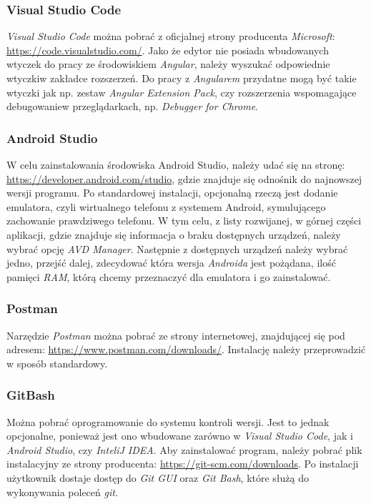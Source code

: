 \documentclass[twoside]{projektInzynierskiMS}
\numberwithin{figure}{section}
\begin{document}
\subsubsection{Visual Studio Code}
\textit{Visual Studio Code} można pobrać z oficjalnej strony producenta \textit{Microsoft}:
\url{https://code.visualstudio.com/}. Jako że edytor nie posiada wbudowanych wtyczek do pracy ze środowiskiem \textit{Angular}, należy wyszukać odpowiednie wtyczki\linebreak w zakładce rozszerzeń. Do pracy z \textit{Angularem} przydatne mogą być takie wtyczki jak np. zestaw \textit{Angular Extension Pack}, czy rozszerzenia wspomagające debugowanie\linebreak w przeglądarkach, np. \textit{Debugger for Chrome}.

\subsubsection{Android Studio}
W celu zainstalowania środowiska Android Studio, należy udać się na stronę:
\url{https://developer.android.com/studio}, gdzie znajduje się odnośnik do najnowszej wersji programu. Po standardowej instalacji, opcjonalną rzeczą jest dodanie emulatora, czyli wirtualnego telefonu z systemem Android, symulującego zachowanie prawdziwego telefonu. W tym celu, z listy rozwijanej, w górnej części aplikacji, gdzie znajduje się informacja o braku dostępnych urządzeń, należy wybrać opcję \textit{AVD Manager}. Następnie z dostępnych urządzeń należy wybrać jedno, przejść dalej, zdecydować która wersja \textit{Androida} jest pożądana, ilość pamięci \textit{RAM}, którą chcemy przeznaczyć dla emulatora i go zainstalować.

\subsubsection{Postman}
Narzędzie \textit{Postman} można pobrać ze strony internetowej, znajdującej się pod adresem: \url{https://www.postman.com/downloads/}. Instalację należy przeprowadzić w sposób standardowy.

\subsubsection{GitBash}
Można pobrać oprogramowanie do systemu kontroli wersji. Jest to jednak opcjonalne, ponieważ jest ono wbudowane zarówno w \textit{Visual Studio Code}, jak i \textit{Android Studio}, czy \textit{InteliJ IDEA}. Aby zainstalować program, należy pobrać plik instalacyjny ze strony producenta: \url{https://git-scm.com/downloads}. Po instalacji użytkownik dostaje dostęp do \textit{Git GUI} oraz \textit{Git Bash}, które służą do wykonywania poleceń \textit{git}.
\end{document}
